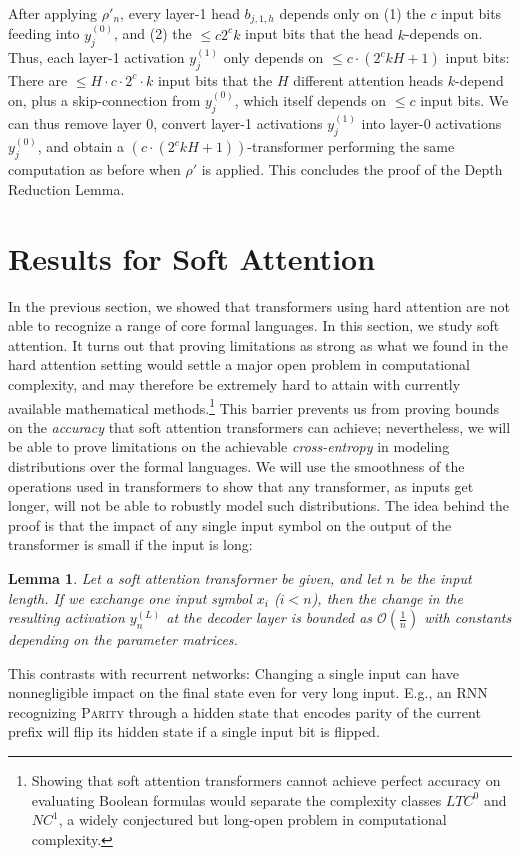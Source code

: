 \documentclass[11pt,a4paper]{article}
\newcounter{theorem}
\newtheorem{lemma}[theorem]{Lemma}
\begin{document}
After applying $\rho'_n$, every layer-1 head $b_{j,1,h}$ depends only on (1) the $c$ input bits feeding into $y_j^{(0)}$, and (2) the $\leq c2^ck$ input bits that the head $k$-depends on.
Thus, each layer-1 activation $y_j^{(1)}$ only depends on $\leq c\cdot (2^ckH+1)$ input bits: There are $\leq H\cdot c \cdot 2^c \cdot k$ input bits that the $H$ different attention heads $k$-depend on, plus a skip-connection from $y_j^{(0)}$, which itself depends on $\leq c$ input bits.
We can thus remove layer 0, convert layer-1 activations $y_j^{(1)}$ into layer-0 activations $y_j^{(0)}$, and obtain a $(c\cdot(2^ckH+1))$-transformer performing the same computation as before when $\rho'$ is applied.
This concludes the proof of the Depth Reduction Lemma.





\section{Results for Soft Attention}\label{sec:soft}

In the previous section, we showed that transformers using hard attention are not able to recognize a range of core formal languages.
In this section, we study soft attention.
It turns out that proving limitations as strong as what we found in the hard attention setting would settle a major open problem in computational complexity, and  may therefore be extremely hard to attain with currently available mathematical methods.\footnote{Showing that soft attention transformers cannot achieve perfect accuracy on evaluating Boolean formulas would separate the complexity classes $LTC^0$ and $NC^1$, a widely conjectured but long-open problem in computational complexity.}
This barrier prevents us from proving bounds on the \emph{accuracy} that soft attention transformers can achieve; nevertheless, we will be able to prove limitations on the achievable \emph{cross-entropy} in modeling distributions over the formal languages.
We will use the smoothness of the operations used in transformers to show that any transformer, as inputs get longer, will not be able to robustly model such distributions.
The idea behind the proof is that the impact of any single input symbol on the output of the transformer is small if the input is long:
\begin{lemma}\label{lem:soft-tech}
Let a soft attention transformer be given, and let $n$ be the input length.
If we exchange one input symbol $x_i$ ($i < n$), %
then the change in the resulting activation $y_n^{(L)}$ at the decoder layer is bounded as $\mathcal{O}(\frac{1}{n})$ with constants depending on the parameter matrices.
\end{lemma}
This contrasts with recurrent networks:
Changing a single input can have nonnegligible impact on the final state even for very long input.
E.g., an RNN recognizing \textsc{Parity} through a hidden state that encodes parity of the current prefix will flip its hidden state if a single input bit is flipped.
\end{document}
